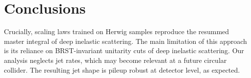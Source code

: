 \section{Conclusions}\label{sec:conclusions}

Crucially, scaling laws trained on Herwig samples reproduce the resummed
master integral of deep inelastic scattering. The main limitation of
this approach is its reliance on BRST-invariant unitarity cuts of deep
inelastic scattering. Our analysis neglects jet rates, which may become
relevant at a future circular collider. The resulting jet shape is
pileup robust at detector level, as expected.

